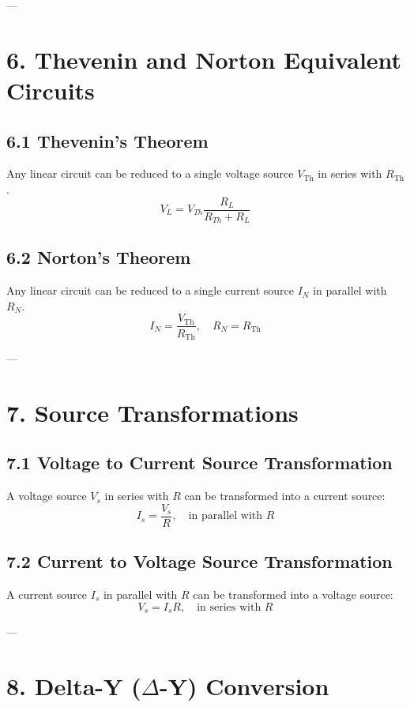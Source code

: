 \documentclass[10pt]{article}
\begin{document}
\begin{multicols}{2}
---

\section*{6. Thevenin and Norton Equivalent Circuits}

\subsection*{6.1 Thevenin's Theorem}
Any linear circuit can be reduced to a single voltage source \( V_{\text{Th}} \) in series with \( R_{\text{Th}} \).
\[
V_L=V_{Th}\frac{R_L}{R_{Th}+R_L}
\]

\subsection*{6.2 Norton's Theorem}
Any linear circuit can be reduced to a single current source \( I_N \) in parallel with \( R_N \).
\[
I_N = \frac{V_{\text{Th}}}{R_{\text{Th}}}, \quad R_N = R_{\text{Th}}
\]

---

\section*{7. Source Transformations}

\subsection*{7.1 Voltage to Current Source Transformation}
A voltage source \( V_s \) in series with \( R \) can be transformed into a current source:
\[
I_s = \frac{V_s}{R}, \quad \text{in parallel with } R
\]

\subsection*{7.2 Current to Voltage Source Transformation}
A current source \( I_s \) in parallel with \( R \) can be transformed into a voltage source:
\[
V_s = I_s R, \quad \text{in series with } R
\]

---

\section*{8. Delta-Y ($\Delta$-Y) Conversion}


\end{multicols}
\end{document}
